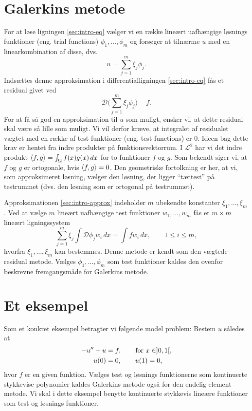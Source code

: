 \section{Galerkins metode}
For at løse ligningen \eqref{sec:intro-eq} vælger vi en række lineært
uafhængige løsnings funktioner (eng. trial functions)
$\phi_1,\ldots,\phi_m$ og forsøger at tilnærme $u$ med en
linearkombination af disse, dvs.
\begin{equation} \label{sec:intro-approx}
u = \sum_{j=1}^m \xi_j \phi_j.
\end{equation}
Indsættes denne approksimation i differentialligningen
\eqref{sec:intro-eq} fås et residual givet ved
\begin{equation}
{\mathcal D}\bigl(\sum_{j=1}^m \xi_j \phi_j\bigr) - f.
\end{equation}
For at få så god en approksimation til $u$ som muligt, ønsker vi, at
dette residual skal være så lille som muligt. Vi vil derfor kræve, at
integralet af residualet vægtet med en række af test funktioner (eng.
test functions) er $0$. Ideen bag dette krav er hentet fra indre
produkter på funktionsvektorrum. I ${\mathcal L}^2$ har vi det indre produkt
$\langle f,g \rangle=\int_{\Omega} f(x)g(x)\, dx$ for to funktioner $f$ og $g$. 
Som bekendt siger vi, at $f$ og $g$ er ortogonale, hvis $\langle f,g \rangle=0$. 
Den geometriske fortolkning er her, at vi, som approksimeret
løsning, vælger den løsning, der ligger ``tættest'' på testrummet
(dvs. den løsning som er ortogonal på testrummet).

Approksimationen \eqref{sec:intro-approx} indeholder $m$ ubekendte
konstanter $\xi_1,\ldots,\xi_m$. Ved at vælge $m$ lineært uafhængige
test funktioner $w_1,\ldots,w_m$ fås et $m\!\times\!m$ lineært
ligningssystem
\begin{equation}
\sum_{j=1}^m \xi_j \int {\mathcal D} \phi_j w_i\, dx = 
\int fw_i\, dx, \qquad 1\leq i\leq m,
\end{equation}
hvorfra $\xi_1,\ldots,\xi_m$ kan bestemmes. Denne metode er kendt som
den vægtede re\-si\-du\-al metode. Vælges $\phi_1,\ldots,\phi_m$ som test
funktioner kaldes den ovenfor beskrevne fremgangsmåde for Galerkins
metode. 
  
\section{Et eksempel}
Som et konkret eksempel betragter vi følgende model problem: Bestem
$u$ således at
\begin{align} \label{sec:eks-problem}
  -u'' + u &  = f, \qquad \text{for $x\in]0,1[$,}  \\ 
      u(0) &  = 0, \qquad u(1) = 0, \notag
\end{align}
hvor $f$ er en given funktion. Vælges test og løsnings funktionerne som
kontinuerte stykkevise polynomier kaldes Galerkins metode også for den
endelig element metode. Vi skal i dette eksempel benytte kontinuerte
stykkevis lineære funktioner som test og løsnings funktioner. 

